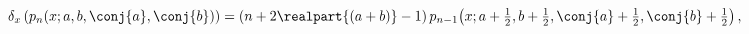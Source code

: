 \[\delta_{x}\left(\mathop{p_{n}\/}\nolimits\!\left(x;a,b,\conj{a},\conj{b}\right%
)\right)=(n+2\realpart{(a+b)}-1)\*\mathop{p_{n-1}\/}\nolimits\!\left(x;a+%
\tfrac{1}{2},b+\tfrac{1}{2},\conj{a}+\tfrac{1}{2},\conj{b}+\tfrac{1}{2}\right),\]